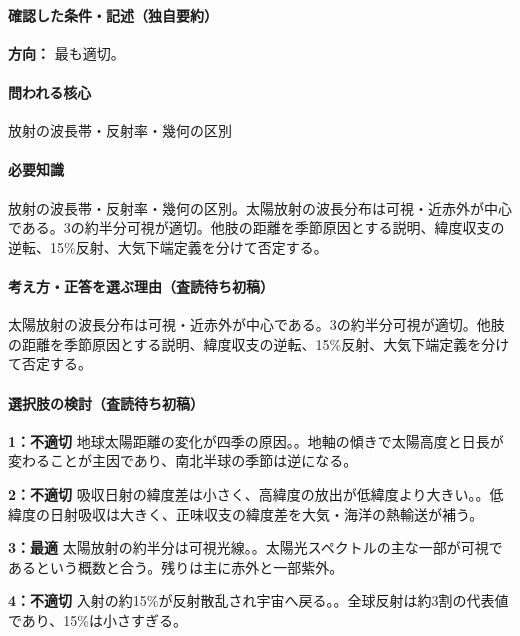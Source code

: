 \paragraph{確認した条件・記述（独自要約）}\mbox{}\par

\noindent\textbf{方向：} 最も適切。\par

\paragraph{問われる核心} 放射の波長帯・反射率・幾何の区別

\paragraph{必要知識} 放射の波長帯・反射率・幾何の区別。太陽放射の波長分布は可視・近赤外が中心である。3の約半分可視が適切。他肢の距離を季節原因とする説明、緯度収支の逆転、15\%反射、大気下端定義を分けて否定する。

\paragraph{考え方・正答を選ぶ理由（査読待ち初稿）} 太陽放射の波長分布は可視・近赤外が中心である。3の約半分可視が適切。他肢の距離を季節原因とする説明、緯度収支の逆転、15\%反射、大気下端定義を分けて否定する。

\paragraph{選択肢の検討（査読待ち初稿）}\mbox{}\par

\noindent\textbf{1：不適切} 地球太陽距離の変化が四季の原因。。地軸の傾きで太陽高度と日長が変わることが主因であり、南北半球の季節は逆になる。\par

\noindent\textbf{2：不適切} 吸収日射の緯度差は小さく、高緯度の放出が低緯度より大きい。。低緯度の日射吸収は大きく、正味収支の緯度差を大気・海洋の熱輸送が補う。\par

\noindent\textbf{3：最適} 太陽放射の約半分は可視光線。。太陽光スペクトルの主な一部が可視であるという概数と合う。残りは主に赤外と一部紫外。\par

\noindent\textbf{4：不適切} 入射の約15\%が反射散乱され宇宙へ戻る。。全球反射は約3割の代表値であり、15\%は小さすぎる。\par

